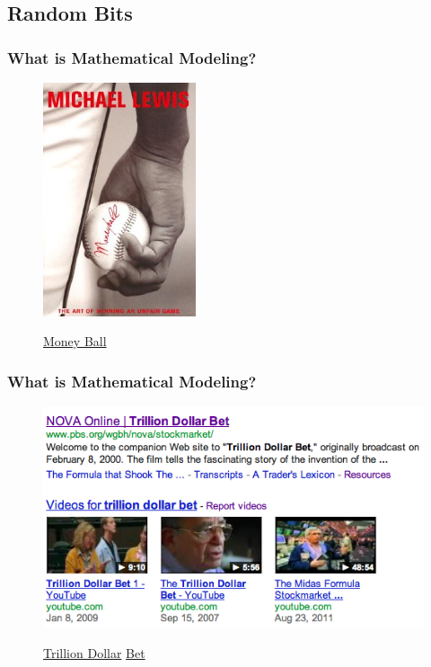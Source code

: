 \documentclass[hyperref={colorlinks=false},compress,handout,10pt]{beamer}
\begin{document}
\subsection{Random Bits}
\begin{frame}
    \frametitle{What is Mathematical Modeling?}
    \begin{figure}
            \centering
            \caption{
            \href{http://www.youtube.com/watch?feature=endscreen&v=UuXwYZ3AQU0&NR=1}
            {Money Ball}}
            \href{http://www.youtube.com/watch?v=WNlCBy07z08}{
            \includegraphics[width=0.4\textwidth]{Moneyballs.jpg}
            }
            \label{fig:MondayBall} 
    \end{figure}
\end{frame}

\begin{frame}
    \frametitle{What is Mathematical Modeling?}
    \begin{figure}
        \centering
        \caption{
        \href{http://www.youtube.com/watch?v=Jzl39jqZjsw&feature=share&list=UUEWRMyobsgQG-PaC9ldME4A}{
        Trillion Dollar} 
        \href{http://www.youtube.com/watch?v=G17rx7H3DtI&feature=BFa&list=UUEWRMyobsgQG-PaC9ldME4A}{Bet}
        }
        \href{http://www.youtube.com/watch?v=dsrOXJwGwtk}{
        \includegraphics[width=\textwidth]{TrillionDollarBet.png}
        }
        \label{fig:LTCM}
    \end{figure}
\end{frame}
\end{document}
